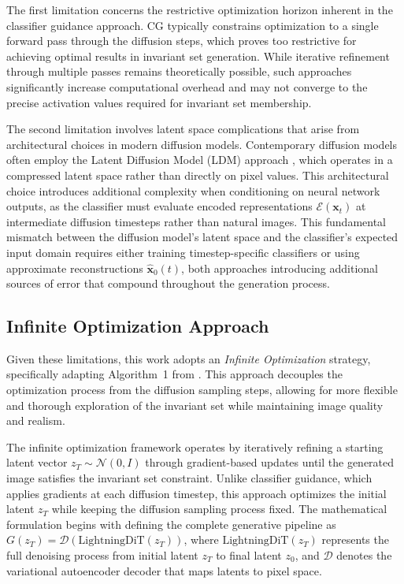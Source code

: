 The first limitation concerns the restrictive optimization horizon inherent in the classifier guidance approach. CG typically constrains optimization to a single forward pass through the diffusion steps, which proves too restrictive for achieving optimal results in invariant set generation. While iterative refinement through multiple passes remains theoretically possible, such approaches significantly increase computational overhead and may not converge to the precise activation values required for invariant set membership.

The second limitation involves latent space complications that arise from architectural choices in modern diffusion models. Contemporary diffusion models often employ the Latent Diffusion Model (LDM) approach \citep{rombach2022highresolutionimagesynthesislatent}, which operates in a compressed latent space rather than directly on pixel values. This architectural choice introduces additional complexity when conditioning on neural network outputs, as the classifier must evaluate encoded representations $\mathcal{E}(\mathbf{x}_t)$ at intermediate diffusion timesteps rather than natural images. This fundamental mismatch between the diffusion model's latent space and the classifier's expected input domain requires either training timestep-specific classifiers or using approximate reconstructions $\hat{\mathbf{x}}_0(t)$, both approaches introducing additional sources of error that compound throughout the generation process.

\subsection{Infinite Optimization Approach}

Given these limitations, this work adopts an \textit{Infinite Optimization} strategy, specifically adapting Algorithm~1 from \citep{augustin2024digindiffusionguidanceinvestigating}. This approach decouples the optimization process from the diffusion sampling steps, allowing for more flexible and thorough exploration of the invariant set while maintaining image quality and realism.

The infinite optimization framework operates by iteratively refining a starting latent vector $z_T \sim \mathcal{N}(0, I)$ through gradient-based updates until the generated image satisfies the invariant set constraint. Unlike classifier guidance, which applies gradients at each diffusion timestep, this approach optimizes the initial latent $z_T$ while keeping the diffusion sampling process fixed. The mathematical formulation begins with defining the complete generative pipeline as $G(z_T) = \mathcal{D}(\text{LightningDiT}(z_T))$, where $\text{LightningDiT}(z_T)$ represents the full denoising process from initial latent $z_T$ to final latent $z_0$, and $\mathcal{D}$ denotes the variational autoencoder decoder that maps latents to pixel space.

